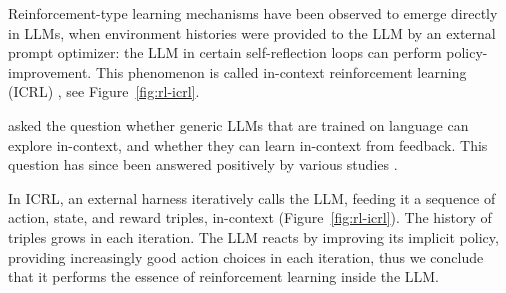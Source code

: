 

Reinforcement-type learning mechanisms  have  been observed to emerge directly in LLMs, when environment histories were provided to the LLM by an external prompt optimizer: the LLM in certain self-reflection loops can perform policy-improvement. This phenomenon is called  in-context reinforcement learning (ICRL) \citep{song2025reward}, see Figure~\ref{fig:rl-icrl}. %


\citet{krishnamurthy2024can}  asked the question whether generic LLMs that are trained on language can explore in-context, and whether they can learn in-context from feedback. This question  has since been answered positively by various studies \citep{demircan2024sparse,song2025reward,moeini2025survey,monea2024llms,nie2024evolve,wang2024transformers}. %

In ICRL,  an external harness  iteratively calls the LLM, feeding it a sequence of action, state, and reward triples, in-context (Figure~\ref{fig:rl-icrl}). The history of triples grows in each iteration. The LLM reacts by improving its implicit policy, providing increasingly good action choices in each iteration, thus we conclude that it performs the essence of reinforcement learning inside the LLM. 

